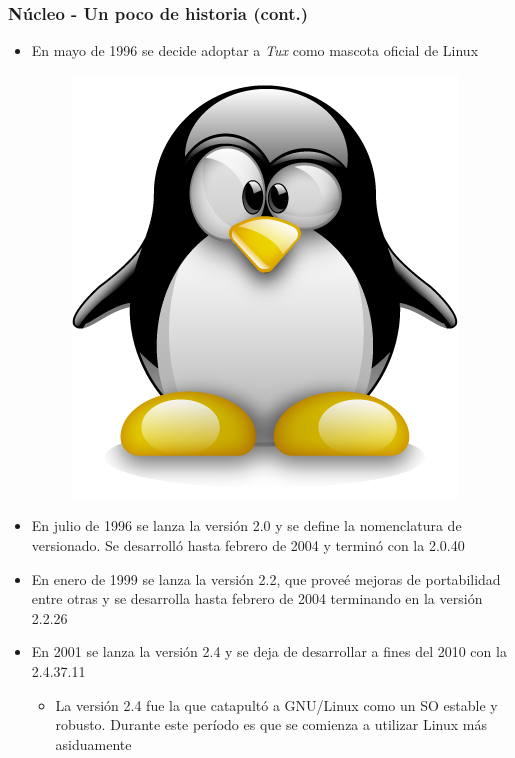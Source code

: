 \begin{frame}
	\frametitle{Núcleo - Un poco de historia (cont.)}
	\begin{itemize}
		\item En mayo de 1996 se decide adoptar a \emph{Tux} como mascota oficial de Linux
		\begin{figure}
			\centering
			\includegraphics[scale=0.05]{images/tux.png}
		\end{figure}
		\item En julio de 1996 se lanza la versión 2.0 y se define la nomenclatura de versionado. Se desarrolló hasta febrero de 2004 y terminó con la 2.0.40
		\item En enero de 1999 se lanza la versión 2.2, que proveé mejoras de portabilidad entre otras y se desarrolla hasta febrero de 2004 terminando en la versión 2.2.26
		\item En 2001 se lanza la versión 2.4 y se deja de desarrollar a fines del 2010 con la 2.4.37.11
		\begin{itemize}
			\item La versión 2.4 fue la que catapultó a GNU/Linux como un SO estable y robusto. Durante este período es que se comienza a utilizar Linux más asiduamente
		\end{itemize}
	\end{itemize}
\end{frame}

